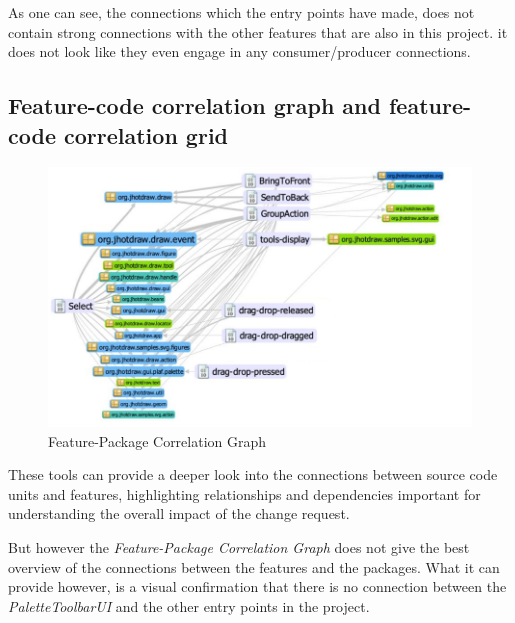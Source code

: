 As one can see, the connections which the entry points have made, does not contain strong connections
with the other features that are also in this project. it does not look like they even engage in any consumer/producer connections.

\subsection{Feature-code correlation graph and feature-code correlation grid}

\begin{figure}[H]
    \centering
    \includegraphics[width=\linewidth]{pic/Feature-Package Correlation Graph.png}
    \caption{Feature-Package Correlation Graph}
    \label{fig:Feature-Package Correlation Graph}
\end{figure}

These tools can provide a deeper look into the connections between source code units and features,
highlighting relationships and dependencies important for understanding the overall impact of the change request.

But however the \textit{Feature-Package Correlation Graph} does not give the best overview of the connections between the features and the packages.
What it can provide however, is a visual confirmation that there is no connection between the \textit{PaletteToolbarUI} and the other entry points in the project.



